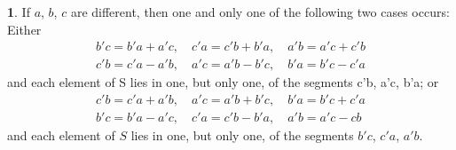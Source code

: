 \documentclass[leqno,hidelinks,a4paper]{article}
\theoremstyle{definition}
\newtheorem{satz}{\protect\satzname}
\newcommand{\satzname}{}
\renewcommand{\satzname}{\hspace{-4pt}.\ Satz}%
\renewcommand{\satzname}{\hspace{-4pt}.\ Theorem}%
\begin{document}
\begin{satz}\label{thm25}
If $a$, $b$, $c$ are different, then one and only one of the following two cases occurs: Either
\begin{multline}
b'c=b'a+a'c,\quad c'a =c'b+b'a,\quad a'b = a'c+c'b \\
c'b=c'a-a'b,\quad a'c=a'b-b'c,\quad b'a=b'c-c'a
\end{multline}
and each element of S lies in one, but only one, of the segments c'b, a'c, b'a; or
\begin{multline}
c'b=c'a+a'b,\quad a'c=a'b+b'c,\quad b'a=b'c + c'a \\
b'c=b'a-a'c,\quad c'a=c'b-b'a,\quad a'b=a'c-cb
\end{multline}
and each element of $S$ lies in one, but only one, of the segments $b'c$, $c'a$, $a'b$.\end{satz}
\end{document}
